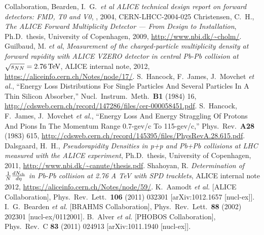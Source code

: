 \documentclass[11pt]{article}
\begin{document}
\clearpage
{}
\begin{thebibliography}{99}
 \ALICE{} Collaboration, Bearden, I.~G.\
  \textit{et al} \textit{ALICE technical design report on forward
    detectors: FMD, T0 and V0}, \CERN{}, 2004, CERN-LHCC-2004-025
\bibitem{cholm:2009} Christensen, C.~H., \textit{The ALICE Forward
    Multiplicity Detector --- From Design to Installation},
  Ph.D.~thesis, University of Copenhagen, 2009,
  \url{http://www.nbi.dk/~cholm/}.
 Guilbaud, M. \textit{et al}, \textit{Measurement of
    the charged-particle multiplicity density at forward rapidity with
    ALICE VZERO detector in central Pb-Pb collision at
    $\sqrt{s_{NN}}=\TeV{2.76}$}, ALICE internal note, 2012,
  \url{https://aliceinfo.cern.ch/Notes/node/17/}.
  S.~Hancock, F.~James, J.~Movchet {\it et al.}, ``Energy Loss
  Distributions For Single Particles And Several Particles In A Thin
  Silicon Absorber,'' Nucl.\ Instrum.\ Meth.\ \textbf{B1} (1984) 16,
  \url{http://cdsweb.cern.ch/record/147286/files/cer-000058451.pdf}.
\bibitem{phyrev:a28:615} 
  S.~Hancock, F.~James, J.~Movchet {\it et al.}, ``Energy Loss And
  Energy Straggling Of Protons And Pions In The Momentum Range
  0.7-gev/c To 115-gev/c,'' Phys.\ Rev.\ \textbf{A28} (1983) 615,
  \url{http://cdsweb.cern.ch/record/145395/files/PhysRevA.28.615.pdf}.
\bibitem{hhd:2009} Dalsgaard, H.~H., \textit{Pseudorapidity Densities
    in p+p and Pb+Pb collisions at LHC measured with the ALICE
    experiment}, Ph.D.~thesis, University of Copenhagen, 2011,
  \url{http://www.nbi.dk/~canute/thesis.pdf}.
 Shahoyan, R. \textit{Determination of $\dndeta$ in
    Pb-Pb collision at 2.76 A TeV with SPD tracklets}, ALICE internal
  note 2012, \url{https://aliceinfo.cern.ch/Notes/node/59/}.
 K.~Aamodt {\it et al.}  [ALICE Collaboration],
  Phys.\ Rev.\ Lett.\  {\bf 106} (2011) 032301
  [arXiv:1012.1657 [nucl-ex]].
 I.~G.~Bearden {\it et al.}  [BRAHMS
  Collaboration],
  Phys.\ Rev.\ Lett.\ {\bf 88} (2002) 202301 [nucl-ex/0112001].
 B.~Alver {\it et al.}  [PHOBOS Collaboration],
  Phys.\ Rev.\ C {\bf 83} (2011) 024913 [arXiv:1011.1940 [nucl-ex]].
\end{thebibliography}
\end{document}
